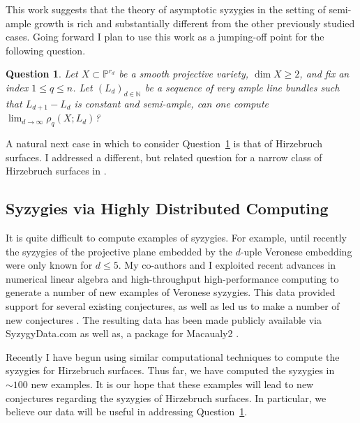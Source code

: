 \documentclass[11pt,reqno]{amsart}
\newtheorem{question}[lemma]{Question}
\theoremstyle{remark}
\newcommand{\N}{\mathbb{N}}
\renewcommand{\P}{\mathbb{P}}
\begin{document}
This work suggests that the theory of asymptotic syzygies in the setting of semi-ample growth is rich and substantially different from the other previously studied cases. Going forward I plan to use this work as a jumping-off point for the following question.  

\begin{question}\label{quest:semi-ample}
Let $X\subset \P^{r_d}$ be a smooth projective variety, $\dim X \geq2$, and fix an index $1\leq q \leq n$. Let $(L_{d})_{d\in\N}$ be a sequence of very ample line bundles such that $L_{d+1}-L_{d}$ is constant and semi-ample, can one compute $\lim_{d\to\infty} \rho_{q}\left(X;L_{d}\right)$?
\end{question}

A natural next case in which to consider Question~\ref{quest:semi-ample} is that of Hirzebruch surfaces. I addressed a different, but related question for a narrow class of Hirzebruch surfaces in \cite{bruce19-hirzebruch}.

\subsection{Syzygies via Highly Distributed Computing}

It is quite difficult to compute examples of syzygies. For example, until recently the syzygies of the projective plane embedded by the $d$-uple Veronese embedding were only known for $d\leq 5$. My co-authors and I exploited recent advances in numerical linear algebra and high-throughput high-performance computing to generate a number of new examples of Veronese syzygies. This data provided support for several existing conjectures, as well as led us to make a number of new conjectures \cite{bruceErmanGoldsteinYang18}. 
The resulting data has been made publicly available via SyzygyData.com as well as, a package for Macaualy2 \cite{bruceErman19}.



Recently I have begun using similar computational techniques to compute the syzygies for Hirzebruch surfaces. Thus far, we have computed the syzygies in  $\sim100$ new examples. It is our hope that these examples will lead to new conjectures regarding the syzygies of Hirzebruch surfaces. In particular, we believe our data will be useful in addressing Question~\ref{quest:semi-ample}.
\end{document}
